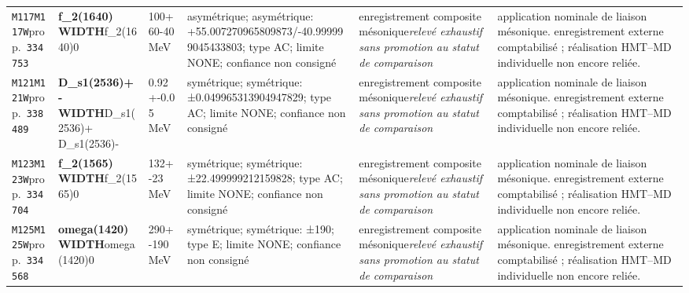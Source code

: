 \begin{landscape}
\begin{longtable}{L{1.85cm}L{4.45cm}L{2.35cm}L{4.05cm}L{3.35cm}L{7.15cm}}
\texttt{M117}\newline \texttt{M117W}\newline prop.\ \texttt{334753} & \textbf{f\_\allowbreak{}2(1640) WIDTH}\newline f\_\allowbreak{}2(1640)0 & 100+60-40\,MeV & asymétrique; asymétrique: +55.007270965809873/-40.999999045433803; type AC; limite NONE; confiance non consigné & enregistrement composite mésonique\newline \emph{relevé exhaustif sans promotion au statut de comparaison} & application nominale de liaison mésonique. enregistrement externe comptabilisé ; réalisation HMT--MD individuelle non encore reliée. \\
\texttt{M121}\newline \texttt{M121W}\newline prop.\ \texttt{338489} & \textbf{D\_\allowbreak{}s1(2536)+- WIDTH}\newline D\_\allowbreak{}s1(2536)+ \textbar{}\allowbreak{} D\_\allowbreak{}s1(2536)- & 0.92+-0.05\,MeV & symétrique; symétrique: ±0.049965313904947829; type AC; limite NONE; confiance non consigné & enregistrement composite mésonique\newline \emph{relevé exhaustif sans promotion au statut de comparaison} & application nominale de liaison mésonique. enregistrement externe comptabilisé ; réalisation HMT--MD individuelle non encore reliée. \\
\texttt{M123}\newline \texttt{M123W}\newline prop.\ \texttt{334704} & \textbf{f\_\allowbreak{}2(1565) WIDTH}\newline f\_\allowbreak{}2(1565)0 & 132+-23\,MeV & symétrique; symétrique: ±22.499999212159828; type AC; limite NONE; confiance non consigné & enregistrement composite mésonique\newline \emph{relevé exhaustif sans promotion au statut de comparaison} & application nominale de liaison mésonique. enregistrement externe comptabilisé ; réalisation HMT--MD individuelle non encore reliée. \\
\texttt{M125}\newline \texttt{M125W}\newline prop.\ \texttt{334568} & \textbf{omega(1420) WIDTH}\newline omega(1420)0 & 290+-190\,MeV & symétrique; symétrique: ±190; type E; limite NONE; confiance non consigné & enregistrement composite mésonique\newline \emph{relevé exhaustif sans promotion au statut de comparaison} & application nominale de liaison mésonique. enregistrement externe comptabilisé ; réalisation HMT--MD individuelle non encore reliée. \\

\end{longtable}
\end{landscape}
